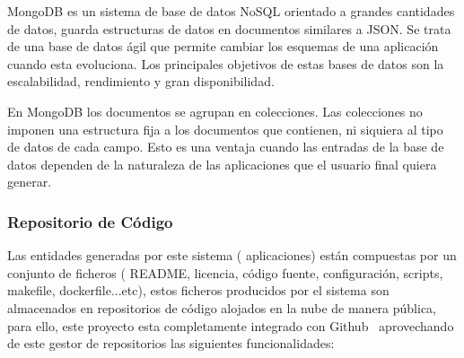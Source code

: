 \documentclass[a4paper,11pt]{book}
\begin{document}
MongoDB es un sistema de base de datos NoSQL orientado a grandes cantidades de datos, guarda estructuras de datos en documentos similares a JSON. Se trata de una base de datos ágil que permite cambiar los esquemas de una aplicación cuando esta evoluciona. Los principales objetivos de estas bases de datos son la escalabilidad, rendimiento y gran disponibilidad.

En MongoDB los documentos se agrupan en colecciones. Las colecciones  no imponen una estructura fija a los documentos que contienen, ni siquiera al tipo de datos de cada campo. Esto es una ventaja cuando las entradas de la base de datos dependen de la naturaleza de las aplicaciones que el usuario final quiera generar.


\subsubsection{Repositorio de Código}\label{repo}

Las entidades generadas por este sistema ( aplicaciones) están compuestas por un conjunto de ficheros ( README, licencia, código fuente, configuración, scripts, makefile, dockerfile...etc), estos ficheros producidos por el sistema son almacenados en repositorios de código alojados en la nube de manera pública, para ello, este proyecto esta completamente integrado con Github~\cite{github} aprovechando de este gestor de repositorios las siguientes funcionalidades: 
\end{document}
